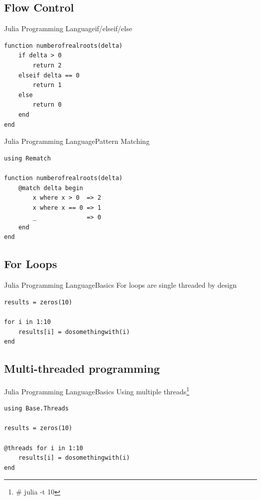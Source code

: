 \documentclass[11pt]{beamer}
\begin{document}
\subsection{Flow Control}
\begin{frame}[fragile]{Julia Programming Language}{if/elseif/else}
\begin{lstlisting}
function numberofrealroots(delta)
	if delta > 0 
		return 2
	elseif delta == 0
		return 1
	else
		return 0
	end
end  
\end{lstlisting}
\end{frame}

\begin{frame}[fragile]{Julia Programming Language}{Pattern Matching}
\begin{lstlisting}
using Rematch

function numberofrealroots(delta)
    @match delta begin
        x where x > 0  => 2
        x where x == 0 => 1
        _              => 0
    end 
end
\end{lstlisting}
\end{frame}



\subsection{For Loops}
\begin{frame}[fragile]{Julia Programming Language}{Basics}
For loops are single threaded by design
\begin{lstlisting}
results = zeros(10)

for i in 1:10
	results[i] = dosomethingwith(i)
end 
\end{lstlisting}
\end{frame}


\subsection{Multi-threaded programming}
\begin{frame}[fragile]{Julia Programming Language}{Basics}
Using multiple threads\footnote{\#\> julia -t 10} 
\begin{lstlisting}
using Base.Threads

results = zeros(10)
	
@threads for i in 1:10
	results[i] = dosomethingwith(i)
end 
\end{lstlisting}
\end{frame}
\end{document}
